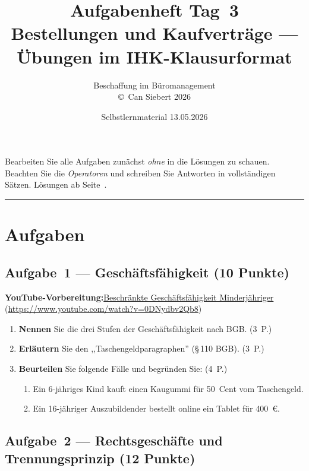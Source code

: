 \documentclass[11pt, a4paper]{article}
\title{\vspace*{-1.5cm}\Huge\bfseries\color{bfwPrimaryDark}Aufgabenheft Tag~3\\[0.4em]
  \large\color{bfwInkSoft}\textnormal{Bestellungen und Kaufverträge --- Übungen im IHK-Klausurformat}}
\author{\textsf{Beschaffung im Büromanagement}\\
\textsf{\small\copyright\ Can Siebert\,\textperiodcentered\,2026}}
\date{Selbstlernmaterial \textperiodcentered{} 13.05.2026}
\begin{document}
\maketitle
\thispagestyle{empty}

\begin{merksatz}[title={\bfseries So nutzen Sie dieses Aufgabenheft}]
Bearbeiten Sie alle Aufgaben zunächst \emph{ohne} in die Lösungen zu schauen.
Beachten Sie die \emph{Operatoren} und schreiben Sie Antworten in vollständigen Sätzen.
Lösungen ab Seite~\pageref{loesungen}.
\end{merksatz}

\tableofcontents
\vspace{1em}
\hrule

\section{Aufgaben}

\subsection*{Aufgabe~1 --- Geschäftsfähigkeit (10 Punkte)}

\noindent\textbf{\color{bfwAccent}YouTube-Vorbereitung:}\enspace \href{https://www.youtube.com/watch?v=0DNydbv2Qb8}{Beschränkte Geschäftsfähigkeit Minderjähriger} (\url{https://www.youtube.com/watch?v=0DNydbv2Qb8})

\medskip
\begin{enumerate}[label=(\alph*)]
  \item \textbf{Nennen} Sie die drei Stufen der Geschäftsfähigkeit nach BGB. \hfill (3~P.)
  \item \textbf{Erläutern} Sie den ,,Taschengeldparagraphen'' (§\,110 BGB). \hfill (3~P.)
  \item \textbf{Beurteilen} Sie folgende Fälle und begründen Sie: \hfill (4~P.)
    \begin{enumerate}[label=\arabic*., leftmargin=*]
      \item Ein 6-jähriges Kind kauft einen Kaugummi für 50~Cent vom Taschengeld.
      \item Ein 16-jähriger Auszubildender bestellt online ein Tablet für 400~€.
    \end{enumerate}
\end{enumerate}

\subsection*{Aufgabe~2 --- Rechtsgeschäfte und Trennungsprinzip (12 Punkte)}
\end{document}

